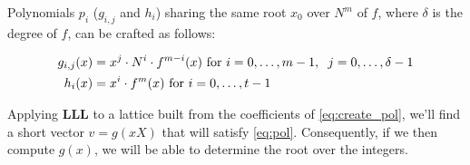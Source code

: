 \documentclass[a4paper,12pt]{report}
\begin{document}
Polynomials $p_i$ ($g_{i,j}$ and $h_i$) sharing the same root $x_0$ over $N^m$ of $f$, where $\delta$ is the degree of $f$, can be crafted as follows:

\begin{center}
    \begin{eqnarray}
        g_{i,j}(x) &= x^j \cdot N^i \cdot f^{m-i}(x) \text{ for } i = 0,\hdots,m-1,\hspace{2mm} j=0,\hdots,\delta-1 \label{eq:create_pol} \\
        h_i(x) &= x^i \cdot f^m(x) \text{ for } i = 0,\hdots,t-1 
    \end{eqnarray}
\end{center}

Applying \textbf{LLL} to a lattice built from the coefficients of \ref{eq:create_pol}, we'll find a short vector $v = g(xX)$ that will satisfy \ref{eq:pol}. Consequently, if we then compute $g(x)$, we will be able to determine the root over the integers.
\end{document}

